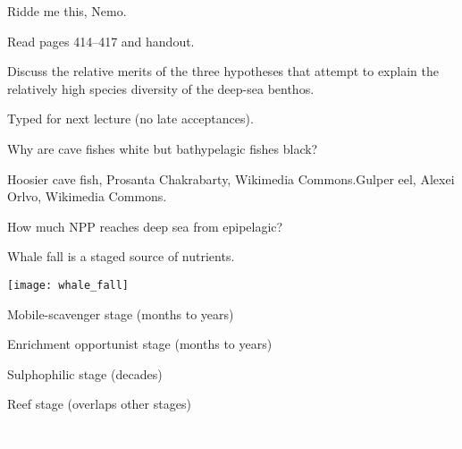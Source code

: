 \documentclass[t]{beamer}
\begin{document}

\begin{frame}[t]{Ridde me this, Nemo.}

	\hangpara Read pages 414--417 and handout.

	\hangpara Discuss the relative merits of the three hypotheses that attempt to explain the relatively high species diversity of the deep-sea benthos.

	\hangpara Typed for next lecture (no late acceptances).
	
\end{frame}

{
\begin{frame}[b]{Why are cave fishes white but bathypelagic fishes black?}

\tiny Hoosier cave fish, Prosanta Chakrabarty, Wikimedia Commons.\hfill Gulper eel, Alexei Orlvo, Wikimedia Commons.
\end{frame}}

{
\begin{frame}[t]{How much NPP reaches deep sea from epipelagic?}
\end{frame}}

\begin{frame}[t]{Whale fall is a staged source of nutrients.}

\vspace*{-\baselineskip}

	\begin{multicols}{2}
		{\centering
		\texttt{[image: whale\_fall]}\par}

	\columnbreak

		\hangpara Mobile-scavenger stage (months to years)

		\hangpara Enrichment opportunist stage (months to years)

		\hangpara Sulphophilic stage (decades)

		\hangpara Reef stage (overlaps other stages)

	\end{multicols}


\end{frame}

{
\begin{frame}[b]

\tiny\hfill\textcolor{white}{Craig Smith NOAA, Wikimedia Commons.}
\end{frame}}
\end{document}
